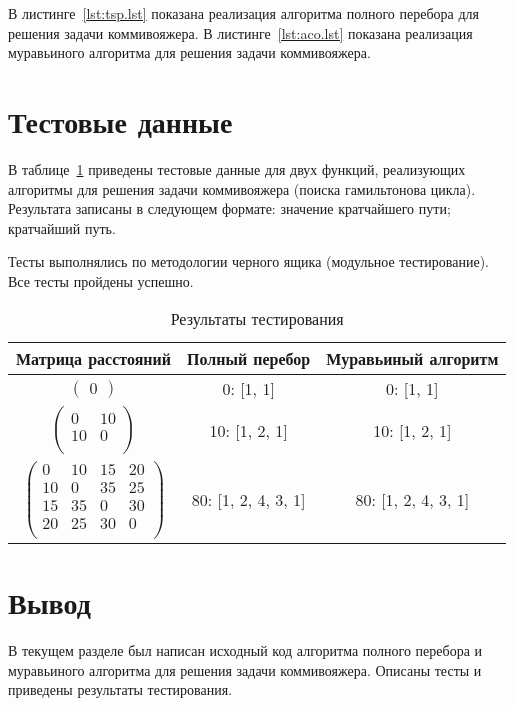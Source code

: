 В листинге~\ref{lst:tsp.lst} показана реализация алгоритма полного перебора для решения задачи коммивояжера.
В листинге~\ref{lst:aco.lst} показана реализация муравьиного алгоритма для решения задачи коммивояжера.
\pagebreak
{}

\section{Тестовые данные}

В таблице~\ref{tbl:tests} приведены тестовые данные для двух функций, реализующих алгоритмы для решения задачи коммивояжера (поиска гамильтонова цикла). 
Результата записаны в следующем формате: значение кратчайшего пути; кратчайший путь.

Тесты выполнялись по методологии черного ящика (модульное тестирование). 
Все тесты пройдены успешно.

\begin{table}[H]
	\begin{center}
		\caption{Результаты тестирования}
		\label{tbl:tests}
		\begin{tabular}{|c|c|c|}
			\hline
			Матрица расстояний & Полный перебор & Муравьиный алгоритм \\
			\hline
				$\begin{pmatrix}
				0
				\end{pmatrix}$ & 0: [1, 1] & 0: [1, 1] \\ \hline
				$\begin{pmatrix}
				0 & 10 \\
				10 & 0 \\
				\end{pmatrix}$ & 10: [1, 2, 1] & 10: [1, 2, 1] \\ \hline
				$\begin{pmatrix}
				0 & 10 & 15 & 20 \\
				10 & 0 & 35 & 25 \\
				15 & 35 & 0 & 30 \\
				20 & 25 & 30 & 0 \\
				\end{pmatrix}$ & 80: [1, 2, 4, 3, 1] & 80: [1, 2, 4, 3, 1] \\
			\hline
		\end{tabular}
	\end{center}
\end{table}

\section*{Вывод}

В текущем разделе был написан исходный код алгоритма полного перебора и муравьиного алгоритма для решения задачи коммивояжера. 
Описаны тесты и приведены результаты тестирования.